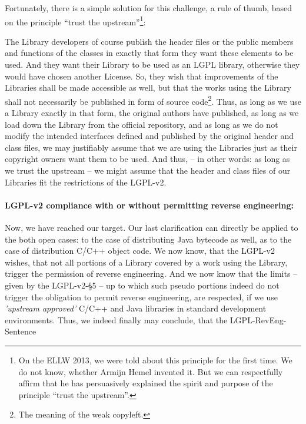 Fortunately, there is a simple solution for this challenge, a rule of thumb,
based on the principle \enquote{trust the upstream}\footnote{On the ELLW 2013,
we were told about this principle for the first time. We do not know, whether
Armijn Hemel invented it. But we can respectfully affirm that he has
persuasively explained the spirit and purpose of the principle \enquote{trust
the upstream}.}:

The Library developers of course publish the header files or the public members
and functions of the classes in exactly that form they want these elements to be
used. And they want their Library to be used as an LGPL library, otherwise they
would have chosen another License. So, they wish that improvements of the
Libraries shall be made accessible as well, but that the works using the Library
shall not necessarily be published in form of source code\footnote{The meaning
of the weak copyleft.}. Thus, as long as we use a Library exactly in that form,
the original authors have published, as long as we load down the Library from
the official repository, and as long as we do not modify the intended interfaces
defined and published by the original header and class files, we may justifiably
assume that we are using the Libraries just as their copyright owners want them
to be used. And thus, -- in other words: as long as we trust the upstream -- we
might assume that the header and class files of our Libraries fit the
restrictions of the LGPL-v2.

\paragraph{LGPL-v2 compliance with or without permitting reverse engineering:} 
\label{RevEngLgpl2ComplianceByRenverseEngine}

Now, we have reached our target. Our last clarification can directly be applied
to the both open cases: to the case of distributing Java bytecode as well, as to
the case of distribution C/C++ object code. We now know, that the LGPL-v2
wishes, that not all portions of a Library covered by a work using the Library,
trigger the permission of reverse engineering. And we now know that the limits
-- given by the LGPL-v2-§5 -- up to which such pseudo portions indeed do not
trigger the obligation to permit reverse engineering, are respected, if we use
\emph{'upstream approved'} C/C++ and Java libraries in standard development
environments. Thus, we indeed finally may conclude, that the
LGPL-RevEng-Sentence

